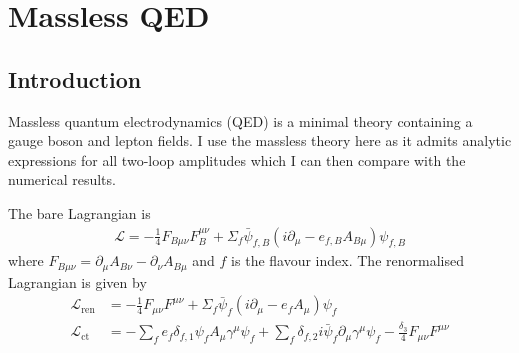 \documentclass[11pt]{article}
\begin{document}
% 
% 
% 
 
 
\section{Massless QED}

\subsection{Introduction}
Massless quantum electrodynamics (QED) is a minimal theory containing a gauge boson and lepton fields.  I use the massless theory here as it admits analytic expressions for all two-loop amplitudes which I can then compare with the numerical results.

The bare Lagrangian is
\begin{align}
\mathcal{L}=-\frac{1}{4}F_{B\mu\nu}F_B^{\mu\nu}+\Sigma_f \bar{\psi}_{f,B}\left(i\partial_{\mu}-e_{f,B}A_{B\mu}\right) \psi_{f,B}
\end{align}
where $F_{B\mu\nu}=\partial_{\mu}A_{B\nu}-\partial_{\nu}A_{B\mu}$ and $f$ is the flavour index.  The renormalised Lagrangian is given by
\begin{align}
\mathcal{L}_{\text{ren}} &= -\frac{1}{4}F_{\mu\nu}F^{\mu\nu}+\Sigma_f \bar{\psi}_{f}\left(i\partial_{\mu}-e_{f}A_{\mu}\right) \psi_{f}\\
\mathcal{L}_{\text{ct}} &= -\sum_fe_f\delta_{f,1}\psi_fA_{\mu}\gamma^{\mu}\psi_f+\sum_f\delta_{f,2}i\bar{\psi}_f\partial_{\mu}\gamma^{\mu}\psi_f-\frac{\delta_3}{4}F_{\mu\nu}F^{\mu\nu}
\end{align}
\end{document}
